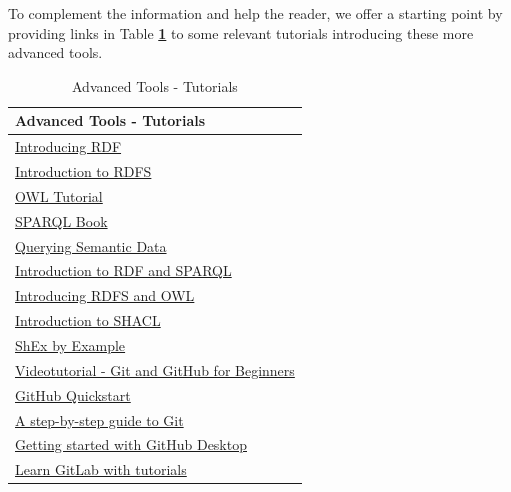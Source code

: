 \documentclass{guideline/sty/rapport}
\begin{document}
\newpage
To complement the information and help the reader, we offer a starting point by providing links in Table \textbf{\ref{tab:additionaltooltutorials}} to some relevant tutorials introducing these more advanced tools.

\begin{table}[H]
	\centering
	\begin{tabular}{l}
		\hline
		\rowcolor{oceanboatblue!20} 
		\textbf{Advanced Tools - Tutorials} \\
		\hline
		\href{http://www.linkeddatatools.com/introducing-rdf-part-2}{Introducing RDF} \\
		\href{https://cgi.di.uoa.gr/~pms547/lectures/introduction-to-rdf-schema-revised-1spp.pdf}{Introduction to RDFS} \\
		\href{https://protege.stanford.edu/conference/2006/submissions/slides/OWLTutorial\_Part1.pdf}{OWL Tutorial} \\
		\href{https://en.wikibooks.org/wiki/SPARQL}{SPARQL Book} \\
		\href{http://www.linkeddatatools.com/querying-semantic-data}{Querying Semantic Data} \\
		\href{https://data.europa.eu/sites/default/files/d2.1.2\_training\_module\_1.3\_introduction\_to\_rdf\_sparql\_en\_edp.pdf}{Introduction to RDF and SPARQL} \\
		\href{http://www.linkeddatatools.com/introducing-rdfs-owl}{Introducing RDFS and OWL} \\
		\href{https://www.ida.liu.se/~robke04/SHACLTutorial/Introduction\%20to\%20SHACL.pdf}{Introduction to SHACL} \\
		\href{http://www.weso.es/RDFValidation\_ESWC16/slides/ShExByExample.pdf}{ShEx by Example} \\
		\href{https://www.youtube.com/watch?v=RGOj5yH7evk}{Videotutorial - Git and GitHub for Beginners} \\
		\href{https://docs.github.com/en/get-started/quickstart}{GitHub Quickstart} \\
		\href{https://opensource.com/article/18/1/step-step-guide-git}{A step-by-step guide to Git} \\
		\href{https://docs.github.com/en/desktop/installing-and-configuring-github-desktop/overview/getting-started-with-github-desktop}{Getting started with GitHub Desktop} \\
		\href{https://opensource.com/article/18/1/step-step-guide-git}{Learn GitLab with tutorials} \\
		\hline
	\end{tabular}
    \caption{Advanced Tools - Tutorials} 
	\label{tab:additionaltooltutorials}
\end{table}
\end{document}
